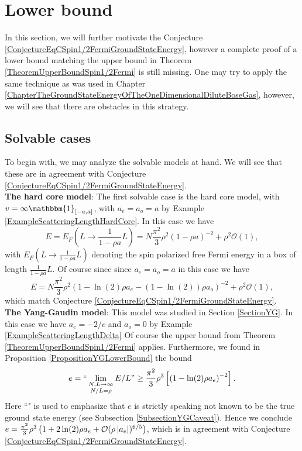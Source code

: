 \section{Lower bound}
In this section, we will further motivate the Conjecture \ref{ConjectureEqCSpin1/2FermiGroundStateEnergy}, however a complete proof of a lower bound matching the upper bound in Theorem \ref{TheoremUpperBoundSpin1/2Fermi} is still missing. One may try to apply the same technique as was used in Chapter \ref{ChapterTheGroundStateEnergyOfTheOneDimensionalDiluteBoseGas}, however, we will see that there are obstacles in this strategy.\\
\subsection{Solvable cases}
To begin with, we may analyze the solvable models at hand. We will see that these are in agreement with Conjecture \ref{ConjectureEqCSpin1/2FermiGroundStateEnergy}.\\

\textbf{The hard core model}: The first solvable case is the hard core model, with $ v=\infty \mathbbm{1}_{[-a,a]} $, with $ a_e=a_o=a $ by Example \ref{ExampleScatteringLengthHardCore}. In this case we have \begin{equation}
E=E_F\left(L\to \frac{1}{1-\rho a}L\right)=N\frac{\pi^2}{3}\rho^2\left(1-\rho a\right)^{-2}+\rho^2\mathcal{O}(1),
\end{equation} 
with $ E_F\left(L\to \frac{1}{1-\rho a}L\right) $ denoting the spin polarized free Fermi energy in a box of length $ \frac{1}{1-\rho a}L $. Of course since since $ a_e=a_o=a $ in this case we have \begin{equation}
E=N\frac{\pi^2}{3}\rho^2\left(1-\ln(2)\rho a_e-(1-\ln(2))\rho a_o\right)^{-2}+\rho^2\mathcal{O}(1),
\end{equation}
which match Conjecture \ref{ConjectureEqCSpin1/2FermiGroundStateEnergy}.\\

\textbf{The Yang-Gaudin model}:
This model was studied in Section \ref{SectionYG}. In this case we have $ a_e=-2/c $ and $ a_o=0 $ by Example \ref{ExampleScatteringLengthDelta} Of course the upper bound from Theorem \ref{TheoremUpperBoundSpin1/2Fermi} applies. Furthermore, we found in Proposition \ref{PropositionYGLowerBound} the bound\begin{equation}
e=``\lim\limits_{\substack{N,L\to\infty\\
N/L=\rho}}E/L"\geq \frac{\pi^2}{3}\rho^3\left[\left(1-\ln(2)\rho a_e\right)^{-2}\right].
\end{equation}
Here ``" is used to emphasize that $ e $ is strictly speaking not known to be the true ground state energy (see Subsection \ref{SubsectionYGCaveat}).
Hence we conclude $ e=\frac{\pi^2}{3}\rho^3\left(1+2\ln(2)\rho a_e+\mathcal{O}(\rho \left\lvert a_e \right\rvert)^{6/5}\right) $, which is in agreement with Conjecture \ref{ConjectureEqCSpin1/2FermiGroundStateEnergy}.

